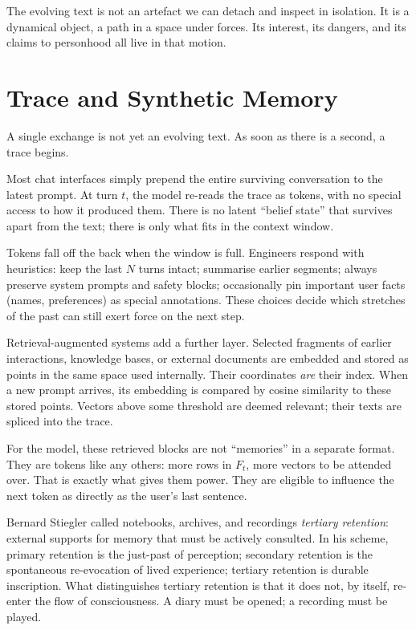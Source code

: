 \documentclass[12pt,a4paper]{article}
\begin{document}
The evolving text is not an artefact we can detach and inspect in isolation. It is a dynamical object, a path in a space under forces. Its interest, its dangers, and its claims to personhood all live in that motion.


\section{Trace and Synthetic Memory}

A single exchange is not yet an evolving text. As soon as there is a second, a trace begins.

Most chat interfaces simply prepend the entire surviving conversation to the latest prompt. At turn $t$, the model re-reads the trace as tokens, with no special access to how it produced them. There is no latent ``belief state'' that survives apart from the text; there is only what fits in the context window.

Tokens fall off the back when the window is full. Engineers respond with heuristics: keep the last $N$ turns intact; summarise earlier segments; always preserve system prompts and safety blocks; occasionally pin important user facts (names, preferences) as special annotations. These choices decide which stretches of the past can still exert force on the next step.

Retrieval-augmented systems add a further layer. Selected fragments of earlier interactions, knowledge bases, or external documents are embedded and stored as points in the same space used internally. Their coordinates \emph{are} their index. When a new prompt arrives, its embedding is compared by cosine similarity to these stored points. Vectors above some threshold are deemed relevant; their texts are spliced into the trace.

For the model, these retrieved blocks are not ``memories'' in a separate format. They are tokens like any others: more rows in $F_t$, more vectors to be attended over. That is exactly what gives them power. They are eligible to influence the next token as directly as the user's last sentence.

Bernard Stiegler called notebooks, archives, and recordings \emph{tertiary retention}: external supports for memory that must be actively consulted.\cite{stiegler2009technics} In his scheme, primary retention is the just-past of perception; secondary retention is the spontaneous re-evocation of lived experience; tertiary retention is durable inscription. What distinguishes tertiary retention is that it does not, by itself, re-enter the flow of consciousness. A diary must be opened; a recording must be played.
\end{document}

